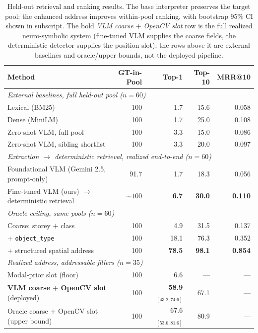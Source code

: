 \begin{table}[ht]
  \centering
  \small
  \begin{tabular}{lrrrr}
    \toprule
    Method & GT-in-Pool & Top-1 & Top-10 & MRR@10 \\
    \midrule
    \multicolumn{5}{l}{\emph{External baselines, full held-out pool ($n=60$)}} \\
    \quad Lexical (BM25)                          & 100 & 1.7  & 15.6 & 0.058 \\
    \quad Dense (MiniLM)                          & 100 & 1.7  & 25.0 & 0.108 \\
    \quad Zero-shot VLM, full pool                & 100 & 3.3  & 15.0 & 0.086 \\
    \quad Zero-shot VLM, sibling shortlist        & 100 & 3.3  & 20.0 & 0.097 \\
    \midrule
    \multicolumn{5}{l}{\emph{Extraction $\to$ deterministic retrieval, realized end-to-end ($n=60$)}} \\
    \quad Foundational VLM (Gemini 2.5, prompt-only)        & 91.7 & 1.7 & 18.3 & 0.056 \\
    \quad Fine-tuned VLM (ours) $\to$ deterministic retrieval & ${\sim}100$ & \textbf{6.7} & \textbf{30.0} & \textbf{0.110} \\
    \midrule
    \multicolumn{5}{l}{\emph{Oracle ceiling, same pools ($n=60$)}} \\
    \quad Coarse: storey $+$ class                & 100 & 4.9  & 31.5 & 0.137 \\
    \quad \quad $+$ \texttt{object\_type}         & 100 & 18.1 & 76.3 & 0.352 \\
    \quad \quad $+$ structured spatial address    & 100 & \textbf{78.5} & \textbf{98.1} & \textbf{0.854} \\
    \midrule
    \multicolumn{5}{l}{\emph{Realized address, addressable fillers ($n=35$)}} \\
    \quad Modal-prior slot (floor)                & 100 & 6.6  & ---  & ---   \\
    \quad \textbf{VLM coarse $+$ OpenCV slot} (deployed) & 100 & \textbf{58.9}$_{[43.2,74.6]}$ & 67.1 & --- \\
    \quad Oracle coarse $+$ OpenCV slot (upper bound)   & 100 & 67.6$_{[53.6,81.6]}$ & 80.9 & --- \\
    \bottomrule
  \end{tabular}
  \caption{Held-out retrieval and ranking results. The base interpreter preserves the target pool;
  the enhanced address improves within-pool ranking, with bootstrap 95\% CI shown in subscript. The
  bold \emph{VLM coarse $+$ OpenCV slot} row is the full realized neuro-symbolic system
  (fine-tuned VLM supplies the coarse fields, the deterministic detector supplies the position-slot);
  the rows above it are external baselines and oracle/upper bounds, not the deployed pipeline.}
  \label{tab:main}
\end{table}


